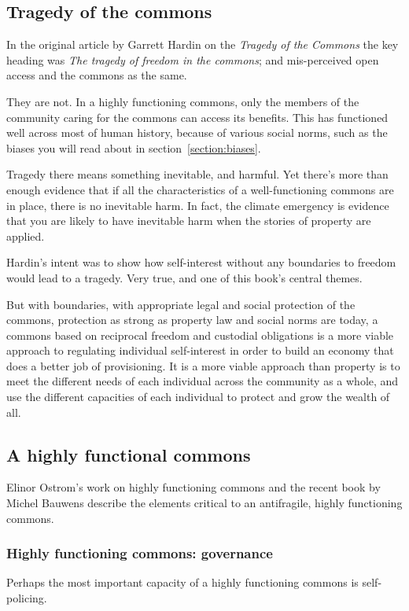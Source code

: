 \subsection{Tragedy of the commons}
In the original article by Garrett Hardin on the \emph{Tragedy of the Commons}\cite{hardin-tragedy} the key heading was \emph{The tragedy of freedom in the commons}; and mis-perceived open access and the commons as the same. 


They are not. In a highly functioning commons, only the members of the community caring for the commons can access its benefits. This has functioned well across most of human history, because of various social norms, such as the biases you will read about in section~\ref{section:biases}.


Tragedy there means something inevitable, and harmful. Yet there's more than enough evidence that if all the characteristics of a well-functioning commons are in place, there is no inevitable harm. In fact, the climate emergency is evidence that you are likely to have inevitable harm when the stories of property are applied.


Hardin's intent was to show how self-interest without any boundaries to freedom would lead to a tragedy. Very true, and one of this book’s central themes. 


But with boundaries, with appropriate legal and social protection of the commons, protection as strong as property law and social norms are today, a commons based on reciprocal freedom and custodial obligations is a more viable approach to regulating individual self-interest in order to build an economy that does a better job of provisioning. It is a more viable approach than property is to meet the different needs of each individual across the community as a whole, and use the different capacities of each individual to protect and grow the wealth of all.


\subsection{A highly functional commons}
Elinor Ostrom's work on highly functioning commons\cite{ostrom-governing} and the recent book by Michel Bauwens\cite{bauwens-peer-to-peer} describe the elements critical to an antifragile, highly functioning commons. 
\subsubsection{Highly functioning commons: governance}
Perhaps the most important capacity of a highly functioning commons is self\hyp{}policing. 


